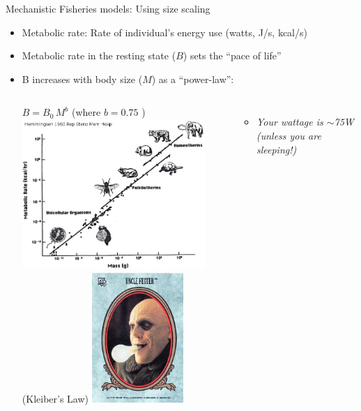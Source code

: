 \documentclass[xcolor={usenames,x11names},compress]{beamer}
\renewcommand{\(}{\begin{columns}}
\renewcommand{\)}{\end{columns}}
\newcommand{\<}[1]{\begin{column}{#1}}
\renewcommand{\>}{\end{column}}
\begin{document}
\begin{frame}{Mechanistic Fisheries models: Using size scaling}
  \pause
  \begin{itemize}
    \item Metabolic rate: Rate of individual's energy use (watts, J/s, kcal/s)
    \item Metabolic rate in the resting state ($B$) sets the ``pace of life''
      \pause
    \item B increases with body size ($M$) as a ``power-law'':

  \begin{columns}[c]
	  \column{2.5in}\centering
	  $B = B_0 \, M^{b}$ (where $b = 0.75$ )\\
	  \includegraphics[width=0.9\textwidth]{MetabScaling.jpg} \\ (Kleiber's Law)
	\column{2.5in}\centering
	\pause
	\includegraphics[width=0.45\textwidth]{fester.jpg}
	\begin{itemize}
	  \item {\it Your wattage is $\sim$75W (unless you are sleeping!)}
	\end{itemize}
      \end{columns}
  \end{itemize}

\end{frame}
\end{document}
